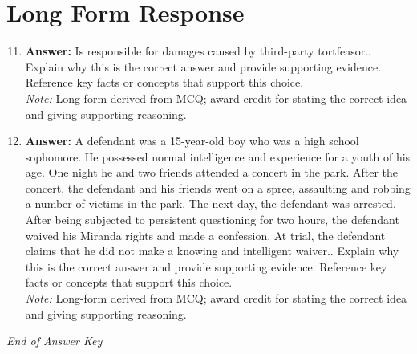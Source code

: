 \documentclass[12pt]{article}
\begin{document}
\section*{Long Form Response}
\begin{enumerate}[label=\arabic*.]
\setcounter{enumi}{10}
\item \textbf{Answer:} Is responsible for damages caused by third-party tortfeasor.. Explain why this is the correct answer and provide supporting evidence. Reference key facts or concepts that support this choice.
\\ \textit{Note:} Long-form derived from MCQ; award credit for stating the correct idea and giving supporting reasoning.
\item \textbf{Answer:} A defendant was a 15-year-old boy who was a high school sophomore. He possessed normal intelligence and experience for a youth of his age. One night he and two friends attended a concert in the park. After the concert, the defendant and his friends went on a spree, assaulting and robbing a number of victims in the park. The next day, the defendant was arrested. After being subjected to persistent questioning for two hours, the defendant waived his Miranda rights and made a confession. At trial, the defendant claims that he did not make a knowing and intelligent waiver.. Explain why this is the correct answer and provide supporting evidence. Reference key facts or concepts that support this choice.
\\ \textit{Note:} Long-form derived from MCQ; award credit for stating the correct idea and giving supporting reasoning.
\end{enumerate}

\vfill
\noindent\textit{End of Answer Key}
\end{document}
